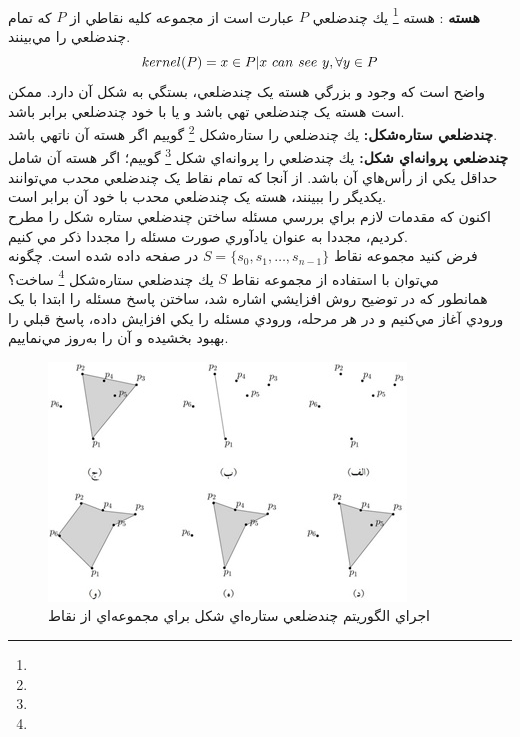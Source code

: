 \documentclass{book}
\begin{document}
\\
            \textbf{هسته}
: هسته 
\footnote{}
 يك چندضلعي  $P$ عبارت است از مجموعه كليه نقاطي از $P$ كه تمام چندضلعي را مي‌بينند.
$$kernel(P)={x\in P|x \hspace{0.125cm} can \hspace{0.125cm} see \hspace{0.125cm} y,\forall y\in P}$$
واضح است که وجود و بزرگي هسته‌ يک چندضلعي، بستگي به شکل آن دارد. ممکن است هسته يک چندضلعي تهي باشد و يا با خود چندضلعي برابر باشد. \\
            \textbf{چندضلعي ستاره‌شكل:}
 يك چندضلعي را ستاره‌شكل 
 \footnote{}
  گوييم اگر هسته آن ناتهي باشد.\\
  \textbf{چندضلعي پروانه‌اي‌ شکل: }
  يك چندضلعي را پروانه‌اي شكل 
   \footnote{}
   گوييم؛ اگر هسته آن شامل حداقل يكي از رأس‌هاي آن باشد.
  از آنجا که تمام نقاط يک چندضلعي محدب مي‌توانند يکديگر را ببينند، هسته يک چندضلعي محدب با خود آن برابر است.\\
  اکنون که مقدمات لازم براي بررسي مسئله ساختن چندضلعي ستاره شکل را مطرح کرديم، مجددا به عنوان يادآوري صورت مسئله را مجددا ذکر مي کنيم. \\
  فرض كنيد مجموعه نقاط 
    $S=\{s_{0}, s_{1},\dots ,s_{n-1}\} $
  در صفحه داده شده است. چگونه مي‌توان با استفاده از مجموعه نقاط $S$  يك چندضلعي ستاره‌شكل 
  \footnote{}
   ساخت؟\\
  همانطور که در توضيح روش افزايشي اشاره شد، ساختن پاسخ مسئله را ابتدا  با يک ورودي آغاز مي‌کنيم و در هر مرحله، ورودي مسئله را يکي افزايش داده، پاسخ قبلي را بهبود بخشيده و آن را به‌روز مي‌نماييم. 
 \begin{figure}[h!]
	\begin{center}
		\includegraphics{9.jpg}
		\caption{
	اجراي الگوريتم چندضلعي ستاره‌اي شکل براي مجموعه‌اي از نقاط}
	\end{center}
   	\label{شکل 9}
\end{figure}  
  
\end{document}
